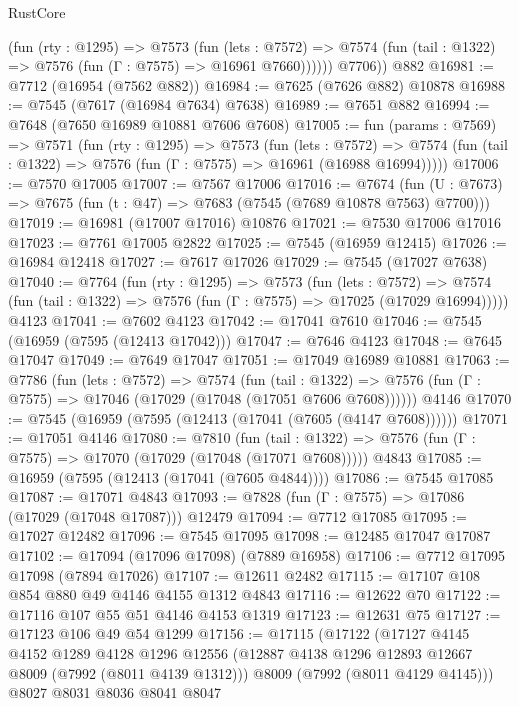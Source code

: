 \begin{lexlean}{RustCore}
\begin{coremodule}
            (fun (rty : @1295) =>
            @7573
              (fun (lets : @7572) =>
              @7574 (fun (tail : @1322) => @7576 (fun (Γ : @7575) => @16961 @7660))))))
        @7706))
    @882
@16981 := @7712 (@16954 (@7562 @882))
@16984 := @7625 (@7626 @882) @10878
@16988 := @7545 (@7617 (@16984 @7634) @7638)
@16989 := @7651 @882
@16994 := @7648 (@7650 @16989 @10881 @7606 @7608)
@17005 := fun (params : @7569) =>
  @7571
    (fun (rty : @1295) =>
    @7573
      (fun (lets : @7572) =>
      @7574 (fun (tail : @1322) => @7576 (fun (Γ : @7575) => @16961 (@16988 @16994)))))
@17006 := @7570 @17005
@17007 := @7567 @17006
@17016 := @7674
    (fun (U : @7673) => @7675 (fun (t : @47) => @7683 (@7545 (@7689 @10878 @7563) @7700)))
@17019 := @16981 (@17007 @17016) @10876
@17021 := @7530 @17006 @17016
@17023 := @7761 @17005 @2822
@17025 := @7545 (@16959 @12415)
@17026 := @16984 @12418
@17027 := @7617 @17026
@17029 := @7545 (@17027 @7638)
@17040 := @7764
    (fun (rty : @1295) =>
    @7573
      (fun (lets : @7572) =>
      @7574 (fun (tail : @1322) => @7576 (fun (Γ : @7575) => @17025 (@17029 @16994)))))
    @4123
@17041 := @7602 @4123
@17042 := @17041 @7610
@17046 := @7545 (@16959 (@7595 (@12413 @17042)))
@17047 := @7646 @4123
@17048 := @7645 @17047
@17049 := @7649 @17047
@17051 := @17049 @16989 @10881
@17063 := @7786
    (fun (lets : @7572) =>
    @7574
      (fun (tail : @1322) =>
      @7576 (fun (Γ : @7575) => @17046 (@17029 (@17048 (@17051 @7606 @7608))))))
    @4146
@17070 := @7545 (@16959 (@7595 (@12413 (@17041 (@7605 (@4147 @7608))))))
@17071 := @17051 @4146
@17080 := @7810
    (fun (tail : @1322) => @7576 (fun (Γ : @7575) => @17070 (@17029 (@17048 (@17071 @7608)))))
    @4843
@17085 := @16959 (@7595 (@12413 (@17041 (@7605 @4844))))
@17086 := @7545 @17085
@17087 := @17071 @4843
@17093 := @7828 (fun (Γ : @7575) => @17086 (@17029 (@17048 @17087))) @12479
@17094 := @7712 @17085
@17095 := @17027 @12482
@17096 := @7545 @17095
@17098 := @12485 @17047 @17087
@17102 := @17094 (@17096 @17098) (@7889 @16958)
@17106 := @7712 @17095 @17098 (@7894 @17026)
@17107 := @12611 @2482
@17115 := @17107 @108 @854 @880 @49 @4146 @4155 @1312 @4843
@17116 := @12622 @70
@17122 := @17116 @107 @55 @51 @4146 @4153 @1319
@17123 := @12631 @75
@17127 := @17123 @106 @49 @54 @1299
@17156 := @17115
    (@17122
      (@17127
        @4145
        @4152
        @1289
        @4128
        @1296
        @12556
        (@12887 @4138 @1296 @12893 @12667 @8009 (@7992 (@8011 @4139 @1312)))
        @8009
        (@7992 (@8011 @4129 @4145)))
      @8027
      @8031
      @8036
      @8041
      @8047

\end{coremodule}
\end{lexlean}
